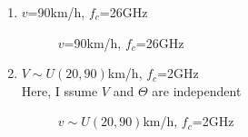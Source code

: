 \documentclass{article}
\begin{document}
\begin{flushleft}
\begin{enumerate}[label=(\alph*)]
\item 
$v$=90km/h, $f_c$=26GHz
\begin{figure}[H]
\centering
{}
\caption{ $v$=90km/h, $f_c$=26GHz}
\end{figure}

\newpage

\item 
$V\sim U(20,90)$km/h, $f_c$=2GHz\\
Here, I ssume $V$ and $\Theta$ are independent
\begin{figure}[H]
\centering
{}
\caption{$v\sim U(20,90)$km/h, $f_c$=2GHz}
\end{figure}



\end{enumerate}
\end{flushleft}
\end{document}
